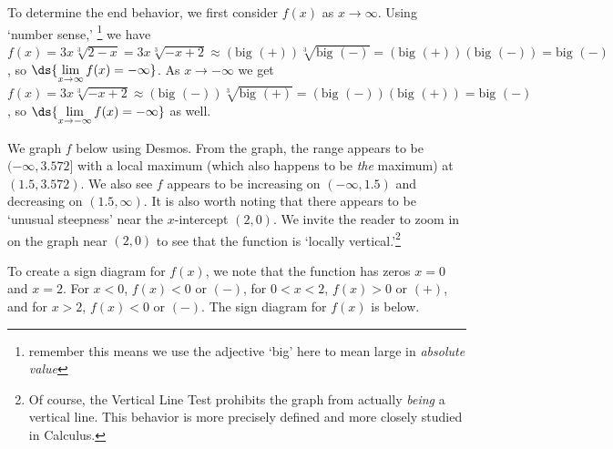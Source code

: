 \documentclass{ximera}
\begin{document}
\begin{example}
\begin{enumerate}
To determine the end behavior, we first consider $f(x)$ as $x \rightarrow  \infty$.  Using `number sense,' \footnote{remember this means we use the adjective `big' here to mean large in \textit{absolute value}} we have $f(x) = 3x \sqrt[3]{2-x} = 3x \sqrt[3]{-x+2} \approx (\text{big $(+)$}) \sqrt[3]{\text{big $(-)$}} = (\text{big $(+)$})(\text{big $(-)$}) = \text{big $(-)$}$, so $\ds{\lim_{x \rightarrow \infty} f(x) = -\infty}$.  As $x \rightarrow -\infty$ we get $f(x) = 3x \sqrt[3]{-x+2} \approx (\text{big $(-)$}) \sqrt[3]{\text{big $(+)$}} = (\text{big $(-)$})(\text{big $(+)$}) = \text{big $(-)$}$, so  $\ds{\lim_{x \rightarrow -\infty} f(x) = -\infty}$ as well.

We graph $f$ below using Desmos.  From the graph, the range appears to be $(-\infty, 3.572]$ with a local maximum (which also happens to be \textit{the} maximum) at $(1.5, 3.572)$.  We also see $f$ appears to be increasing on $(-\infty, 1.5)$ and decreasing on $(1.5, \infty)$.  It is also worth noting that there appears to be `unusual steepness' near the $x$-intercept $(2,0)$.  We invite the reader to zoom in on the graph near $(2,0)$ to see that the function is `locally vertical.'\footnote{Of course, the Vertical Line Test prohibits the graph from actually \textit{being} a vertical line.  This behavior is more precisely defined and more closely studied in Calculus.}

\begin{center}
\end{center}


To create a sign diagram for $f(x)$, we note that the function has zeros $x = 0$ and $x=2$. For $x<0$, $f(x) < 0$ or $(-)$, for $0<x<2$, $f(x) > 0$ or $(+)$, and for $x>2$, $f(x) < 0$ or $(-)$.  The sign diagram for $f(x)$ is below.

\begin{center}

% 
\end{center}




\end{enumerate}
\end{example}
\end{document}
